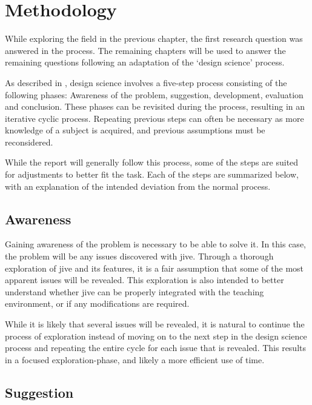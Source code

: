 \chapter{Methodology}\label{methodology}

While exploring the field in the previous chapter, the first research question was answered in the process.
The remaining chapters will be used to answer the remaining questions following an adaptation of the `design science' process.

As described in \cite{Vaishnavi2004}, design science involves a five-step process consisting of the following phases: Awareness of the problem, suggestion, development, evaluation and conclusion.
These phases can be revisited during the process, resulting in an iterative cyclic process.
Repeating previous steps can often be necessary as more knowledge of a subject is acquired, and previous assumptions must be reconsidered.

While the report will generally follow this process, some of the steps are suited for adjustments to better fit the task.
Each of the steps are summarized below, with an explanation of the intended deviation from the normal process.

\section{Awareness}\label{methAware}

Gaining awareness of the problem is necessary to be able to solve it.
In this case, the problem will be any issues discovered with \gls{jive}.
Through a thorough exploration of \gls{jive} and its features, it is a fair assumption that some of the most apparent issues will be revealed.
This exploration is also intended to better understand whether \gls{jive} can be properly integrated with the teaching environment, or if any modifications are required.

While it is likely that several issues will be revealed, it is natural to continue the process of exploration instead of moving on to the next step in the design science process and repeating the entire cycle for each issue that is revealed.
This results in a focused exploration-phase, and likely a more efficient use of time.

\section{Suggestion}\label{methSuggest}

